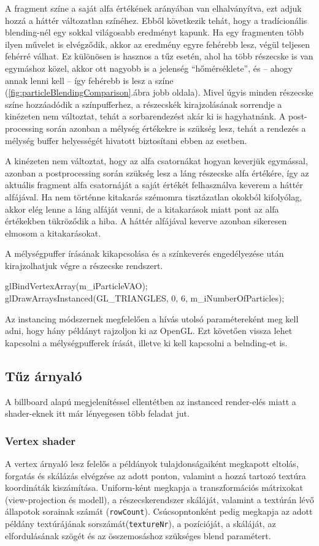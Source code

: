 A fragment színe a saját alfa értékének arányában van elhalványítva, ezt adjuk hozzá a háttér változatlan színéhez. Ebből következik tehát, hogy a tradícionális blending-nél egy sokkal világosabb eredményt kapunk. Ha egy fragmenten több ilyen művelet is elvégződik, akkor az eredmény egyre fehérebb lesz, végül teljesen fehérré válhat. Ez különösen is hasznos a tűz esetén, ahol ha több részecske is van egymáshoz közel, akkor ott nagyobb is a jelenség ``hőmérséklete'', és -- ahogy annak lenni kell -- így fehérebb is lesz a színe (\ref{fig:particleBlendingComparison}.ábra jobb oldala). Mivel úgyis minden részecske színe hozzáadódik a színpufferhez, a részecskék kirajzolásának sorrendje a kinézeten nem változtat, tehát a sorbarendezést akár ki is hagyhatnánk. A post-processing során azonban a mélység értékekre is szükség lesz, tehát a rendezés a mélység buffer helyességét hivatott biztosítani ebben az esetben.

A kinézeten nem változtat, hogy az alfa csatornákat hogyan keverjük egymással, azonban a postprocessing során szükség lesz a láng részecske alfa értékére, így az aktuális fragment alfa csatornáját a saját értékét felhasználva keverem a háttér alfájával. Ha nem történne kitakarás szémomra tisztázatlan okokból kifolyólag, akkor elég lenne a láng alfáját venni, de a kitakarások miatt pont az alfa értékekben tükröződik a hiba. A háttér alfájával keverve azonban sikeresen elmosom a kitakarásokat.

A mélységpuffer írásának kikapcsolása és a színkeverés engedélyezése után kirajzolhatjuk végre a részecske rendszert.
\begin{cpp}
glBindVertexArray(m_iParticleVAO);
glDrawArraysInstanced(GL_TRIANGLES, 0, 6, m_iNumberOfParticles);
\end{cpp}
Az instancing módszernek megfelelően a hívás utolsó paramétereként meg kell adni, hogy hány példányt rajzoljon ki az OpenGL. Ezt követően vissza lehet kapcsolni a mélységpufferek írását, illetve ki kell kapcsolni a belnding-et is.

\subsection{Tűz árnyaló}
A billboard alapú megjelenítéssel ellentétben az instanced render-elés miatt a shader-eknek itt már lényegesen több feladat jut. 

\subsubsection{Vertex shader}
A vertex árnyaló lesz felelős a példányok tulajdonságaiként megkapott eltolás, forgatás és skálázás elvégzése az adott ponton, valamint a hozzá tartozó textúra koordináták kiszámítása. Uniform-ként megkapja a transzformációs mátrixokat (view-projection és modell), a részecskerendszer skáláját, valamint a textúrán lévő állapotok sorainak számát (\texttt{rowCount}). Csúcsopntonként pedig megkapja az adott példány textúrájának sorszámát(\texttt{textureNr}), a pozícióját, a skáláját, az elfordulásának szögét és az összemosáshoz szükséges blend paramétert. 

